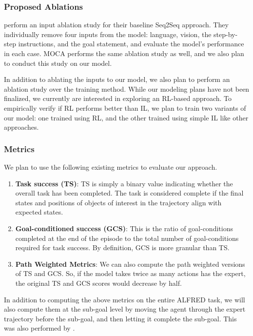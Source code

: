 \documentclass[11pt,a4paper]{article}
\begin{document}
\subsubsection{Proposed Ablations}
 perform an input ablation study for their baseline Seq2Seq approach. They individually remove four inputs from the model: language, vision, the step-by-step instructions, and the goal statement, and evaluate the model's performance in each case. MOCA \cite{singh2020moca} performs the same ablation study as well, and we also plan to conduct this study on our model.

In addition to ablating the inputs to our model, we also plan to perform an ablation study over the training method. While our modeling plans have not been finalized, we currently are interested in exploring an RL-based approach. To empirically verify if RL performs better than IL, we plan to train two variants of our model: one trained using RL, and the other trained using simple IL like other approaches.

\subsubsection{Metrics}
We plan to use the following existing metrics to evaluate our approach.
\begin{enumerate}
    \item \textbf{Task success (TS)}: TS is simply a binary value indicating whether the overall task has been completed. The task is considered complete if the final states and positions of objects of interest in the trajectory align with expected states.
    \item \textbf{Goal-conditioned success (GCS)}: This is the ratio of goal-conditions completed at the end of the episode to the total number of goal-conditions required for task success. By definition, GCS is more granular than TS.
    \item \textbf{Path Weighted Metrics}: We can also compute the path weighted versions of TS and GCS. So, if the model takes twice as many actions has the expert, the original TS and GCS scores would decrease by half.
\end{enumerate}

In addition to computing the above metrics on the entire ALFRED task, we will also compute them at the sub-goal level by moving the agent through the expert trajectory before the sub-goal, and then letting it complete the sub-goal. This was also performed by .
\end{document}
